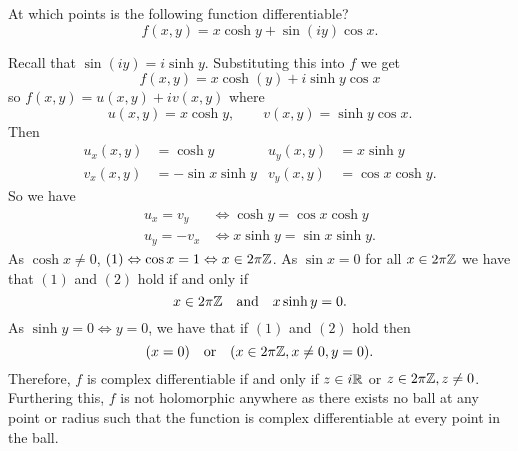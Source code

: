 \question At which points is the following function differentiable?
\[ f(x, y) = x\cosh{y} + \sin{(iy)} \cos{x}. \]
\begin{solution}
    Recall that $\sin{(iy)} = i\sinh{y}$. Substituting this into $f$ we get
    \[ f(x, y) = x\cosh(y) + i\sinh{y}\cos{x} \]
    so $f(x, y) = u(x, y) + iv(x, y)$ where
    \[ u(x, y) = x\cosh{y}, \qquad v(x, y) = \sinh{y}\cos{x}. \]
    Then
    \begin{align*}
        u_x(x, y) &= \cosh{y}         & u_y(x, y) &= x\sinh{y}               \\
        v_x(x, y) &= -\sin{x}\sinh{y} & v_y(x, y) &= \cos{x}\cosh{y}.
    \end{align*}
    So we have
    \begin{align*}
        u_x = v_y  &\iff \cosh{y}  = \cos{x}\cosh{y} \tag{1} \\
        u_y = -v_x &\iff x\sinh{y} = \sin{x}\sinh{y} \tag{2}.
    \end{align*}
    As $\cosh{x} \neq 0$, $(1) \Leftrightarrow \cos{x} = 1 \Leftrightarrow x \in 2\pi\mathbb{Z}$. As $\sin{x} = 0$ for all $x \in 2\pi\mathbb{Z}$ we have that $(1)$ and $(2)$ hold if and only if
    \[ x \in 2\pi\mathbb{Z} \quad\text{and}\quad x\sinh{y} = 0. \] As $\sinh{y} = 0 \iff y = 0$, we have that if $(1)$ and $(2)$ hold then
    \[ (x = 0) \quad \text{or} \quad ( x \in 2\pi\mathbb{Z}, x \neq 0, y = 0). \]
    Therefore, $f$ is complex differentiable if and only if $z \in i\mathbb{R}$ or $z \in 2\pi\mathbb{Z}, z\neq 0$. Furthering this, $f$ is not holomorphic anywhere as there exists no ball at any point or radius such that the function is complex differentiable at every point in the ball.
\end{solution}
